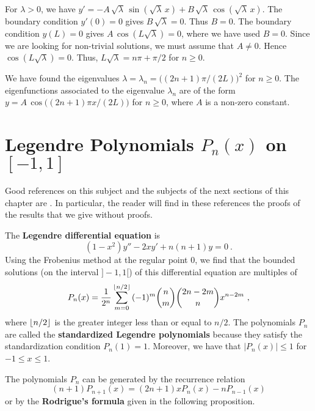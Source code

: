 \begin{egg}
 For $\lambda > 0$, we have
$\displaystyle y' = -A\,\sqrt{\lambda}\, \sin\left(\sqrt{\lambda}\,x\right) +
B\, \sqrt{\lambda}\, \cos\left(\sqrt{\lambda}\,x\right)$.
The boundary condition $y'(0)=0$ gives
$B\, \sqrt{\lambda} = 0$.  Thus $B=0$.  The boundary condition
$y(L) = 0$ gives
$\displaystyle A\,\cos\left(L\sqrt{\lambda}\right)=0$,
where we have used $B=0$. Since we are looking for non-trivial
solutions, we must assume that $A\neq 0$.  Hence
$\displaystyle \cos\left( L\sqrt{\lambda}\right) = 0$.  Thus,
$\displaystyle L\sqrt{\lambda} = n\pi + \pi/2$ for $n \geq 0$.

We have found the eigenvalues
$\displaystyle \lambda = \lambda_n = \big( (2n+1)\pi/(2L) \big)^2$
for $n \geq 0$.  The eigenfunctions associated to the
eigenvalue $\lambda_n$ are of the form
$\displaystyle y = A \, \cos\big((2n+1)\pi x/ (2L) \big)$
for $n \geq 0$, where $A$ is a non-zero constant.
\end{egg}

\section{Legendre Polynomials $P_n(x)$ on $[-1,1]$}
\label{SectLegendrePoly}

Good references on this subject and the subjects of the next sections
of this chapter are \cite{Rain,Simm}.  In particular, the reader will
find in these references the proofs of the results that we give
without proofs.

The {\bfseries Legendre differential equation} is
\begin{equation} \label{spv_leg_equ}
(1-x^2)y'' -2xy' + n(n+1) y = 0 \ .
\end{equation}
Using the Frobenius method at the regular point $0$, we find that the
bounded solutions (on the interval $]-1,1[$) of this differential
equation are multiples of
\[
P_n(x) = \frac{1}{2^n} \sum_{m=0}^{\lfloor{n/2}\rfloor} \, (-1)^m \binom{n}{m}
\binom{2n-2m}{n} x^{n-2m} \ ,
\]
where $\lfloor{n/2}\rfloor$ is the greater integer less than or equal to $n/2$.
The polynomials $P_n$ are called the
{\bfseries standardized Legendre polynomials} because they satisfy the standardization
condition $P_n(1) = 1$.  Moreover, we have that $|P_n(x)| \leq 1$ for
$-1 \leq x \leq 1$.

The polynomials $P_n$ can be generated by the recurrence relation
\[
(n+1) P_{n+1}(x) = (2n+1) x P_n(x) - n P_{n-1}(x)
\]
or by the {\bfseries Rodrigue's formula} given in the following proposition.

